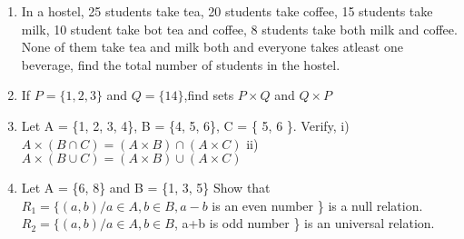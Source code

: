 \documentclass[14pt]{article}
\begin{document}
\begin{multicols}{2}
\begin{enumerate}[resume]
		 
\item In a hostel, 25 students take tea, 20 students
take coffee, 15 students take milk, 10
student take bot tea and coffee, 8 students
take both milk and coffee. None of them
take tea and milk both and everyone takes
atleast one beverage, find the total number
of students in the hostel.

\item If $P = \{1, 2, 3 \} $ and $Q = \{14 \}$,find sets $P \times Q $ and $Q \times P$

\item Let A = \{1, 2, 3, 4\}, B = \{4, 5, 6\}, C = \{ 5, 6 \}.
 Verify, i) $A \times (B \cap C) = (A \times B) \cap (A \times C)$				
ii) $ A \times (B \cup C) = (A \times B) \cup (A \times C)$

\item Let A = \{6, 8\} and B = \{1, 3, 5\} Show that $ R_1 = \{ (a, b) / a \in A, b\in B, a - b$
is an even number \} is a null relation.
$R_2 = \{(a, b)/a \in A, b \in B$, a+b is odd number \}
is an universal relation.
\end{enumerate} 



\end{multicols}
 
\end{document}
